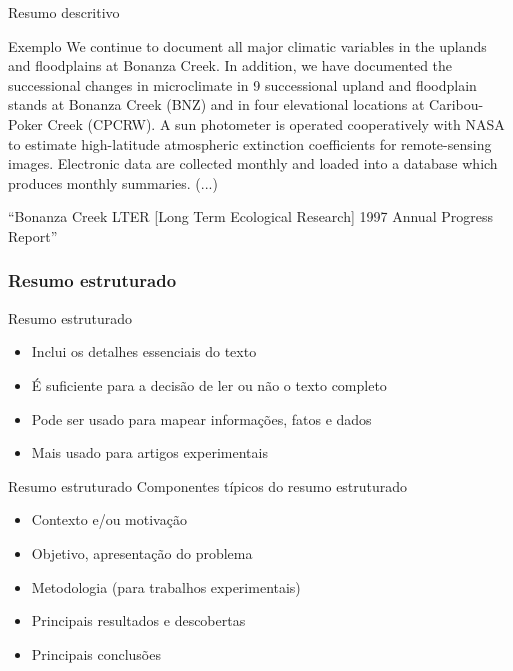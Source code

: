 \documentclass{beamer}
\begin{document}
\begin{frame}{Resumo descritivo}
  \begin{exampleblock}{Exemplo}
    \scriptsize
    We continue to document all major climatic variables in the
    uplands and floodplains at Bonanza Creek. In addition, we have
    documented the successional changes in microclimate in 9
    successional upland and floodplain stands at Bonanza Creek (BNZ)
    and in four elevational locations at Caribou-Poker Creek
    (CPCRW). A sun photometer is operated cooperatively with NASA to
    estimate high-latitude atmospheric extinction coefficients for
    remote-sensing images. Electronic data are collected monthly and
    loaded into a database which produces monthly summaries.  (...)
  \end{exampleblock}

  \vfill
  \tiny
  \hfill ``Bonanza Creek LTER [Long Term Ecological Research] 1997 Annual
  Progress Report''
\end{frame}

\subsubsection[Estruturado]{Resumo estruturado}

\begin{frame}{Resumo estruturado}
  \begin{itemize}
    \footnotesize
  \item Inclui os detalhes essenciais do texto
    \bigskip
  \item É suficiente para a decisão de ler ou não o texto completo
    \bigskip
  \item Pode ser usado para mapear informações, fatos e dados
    \bigskip
  \item Mais usado para artigos experimentais
  \end{itemize}
\end{frame}

\begin{frame}{Resumo estruturado}
  Componentes típicos do resumo estruturado
  \begin{itemize}
    \footnotesize
  \item Contexto e/ou motivação
    \bigskip
  \item Objetivo, apresentação do problema
    \bigskip
  \item Metodologia (para trabalhos experimentais)
    \bigskip
  \item Principais resultados e descobertas
    \bigskip
  \item Principais conclusões
  \end{itemize}
\end{frame}
\end{document}
